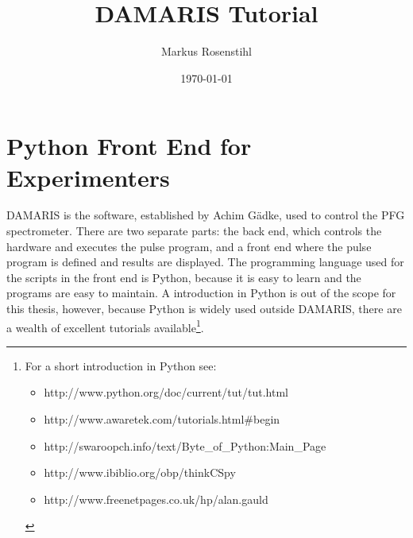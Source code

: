 \documentclass[12pt, a4paper, BCOR10mm, twoside, titlepage, headinclude]{scrbook}
\begin{document}
\setcapindent{1em}
\renewcommand*{\figureformat}{\bf{\figurename}~\thefigure\autodot}
\pagestyle{scrheadings}
\setheadsepline{.5pt} 



%

\title{\textsf{DAMARIS} Tutorial}
\author{Markus Rosenstihl}
\date{\today{}}
\titlehead{AG Fujara}
\maketitle
\newpage
\tableofcontents
\newpage
\chapter{Python Front End for Experimenters}
\label{damarisexp}
\textsf{DAMARIS} \citep{Gadke:2006fk} is the software, established by Achim G\"adke, used to control the PFG spectrometer. There are two separate parts: the back end, which controls the hardware and executes the pulse program, and a front end where the pulse program is defined and results are displayed. The programming language used for the scripts in the front end is Python, because it is easy to learn and the programs are easy to maintain. A introduction in Python is out of the scope for this thesis, however, because Python is widely used outside \textsf{DAMARIS}, there are a wealth of excellent tutorials available\footnote{For a short introduction in Python see:
\begin{itemize}
\item http://www.python.org/doc/current/tut/tut.html
\item http://www.awaretek.com/tutorials.html\#begin
\item http://swaroopch.info/text/Byte\_of\_Python:Main\_Page
\item http://www.ibiblio.org/obp/thinkCSpy
\item http://www.freenetpages.co.uk/hp/alan.gauld
\end{itemize}}.
\end{document}
